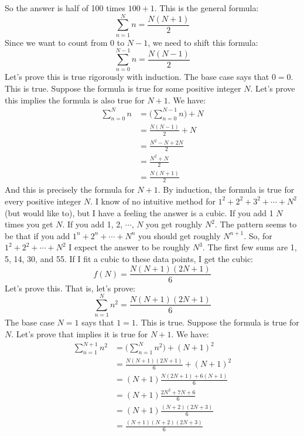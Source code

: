 \documentclass{article}
\theoremstyle{normal}
\begin{document}
    So the answer is half of 100 times $100+1$. This is the general formula:
    \begin{equation}
        \sum_{n=1}^{N}n=\frac{N(N+1)}{2}
    \end{equation}
    Since we want to count from 0 to $N-1$, we need to shift this formula:
    \begin{equation}
        \sum_{n=0}^{N-1}n=\frac{N(N-1)}{2}
    \end{equation}
    Let's prove this is true rigorously with induction. The base case says that
    $0=0$. This is true. Suppose the formula is true for some positive integer
    $N$. Let's prove this implies the formula is also true for $N+1$. We have:
    \begin{align}
        \sum_{n=0}^{N}n
            &=\Big(\sum_{n=0}^{N-1}n\Big)+N\tag{Definition of $\Sigma$}\\
            &=\frac{N(N-1)}{2}+N\tag{Inductive Hypothesis}\\
            &=\frac{N^{2}-N+2N}{2}\tag{Factoring and Common Denominators}\\
            &=\frac{N^{2}+N}{2}\tag{Simplify}\\
            &=\frac{N(N+1)}{2}\tag{Factor}
    \end{align}
    And this is precisely the formula for $N+1$. By induction, the formula
    is true for every positive integer $N$.
    \newpage
    I know of no intuitive method for $1^{2}+2^{2}+3^{2}+\cdots+N^{2}$
    (but would like to), but I have a feeling the answer is a cubic. If you
    add 1 $N$ times you get $N$. If you add 1, 2, $\cdots$, $N$ you get
    roughly $N^{2}$. The pattern seems to be that if you add
    $1^{n}+2^{n}+\cdots+N^{n}$ you should get roughly $N^{n+1}$. So, for
    $1^{2}+2^{2}+\cdots+N^{2}$ I expect the answer to be roughly $N^{3}$.
    The first few sums are 1, 5, 14, 30, and 55. If I fit a cubic to these
    data points, I get the cubic:
    \begin{equation}
        f(N)=\frac{N(N+1)(2N+1)}{6}
    \end{equation}
    Let's prove this. That is, let's prove:
    \begin{equation}
        \sum_{n=1}^{N}n^{2}=\frac{N(N+1)(2N+1)}{6}
    \end{equation}
    The base case $N=1$ says that $1=1$. This is true. Suppose the formula is
    true for $N$. Let's prove that implies it is true for $N+1$. We have:
    \begin{align}
        \sum_{n=1}^{N+1}n^{2}
            &=\Big(\sum_{n=1}^{N}n^{2}\Big)+(N+1)^{2}\\
            &=\frac{N(N+1)(2N+1)}{6}+(N+1)^{2}\\
            &=(N+1)\frac{N(2N+1)+6(N+1)}{6}\\
            &=(N+1)\frac{2N^{2}+7N+6}{6}\\
            &=(N+1)\frac{(N+2)(2N+3)}{6}\\
            &=\frac{(N+1)(N+2)(2N+3)}{6}
    \end{align}
\end{document}

